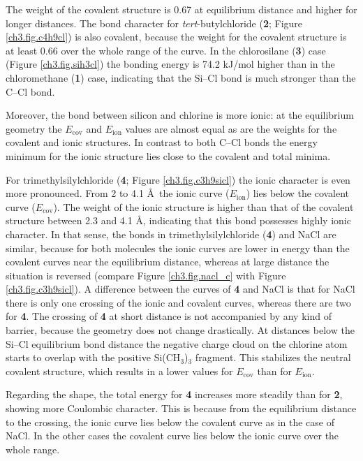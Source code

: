 The weight of the covalent structure is 0.67 at equilibrium distance and higher for longer distances. The bond character for \textit{tert}-butylchloride (\textbf{2}; Figure \ref{ch3.fig.c4h9cl}) is also covalent, because the weight for the covalent structure is at least 0.66 over the whole range of the curve.
In the chlorosilane (\textbf{3}) case (Figure \ref{ch3.fig.sih3cl}) the bonding energy is 74.2 kJ/mol higher than in the chloromethane (\textbf{1}) case, indicating that the Si--Cl bond is much stronger than the C--Cl bond. 

Moreover, the bond between silicon and chlorine is more ionic: at the equilibrium geometry the $E_\mathrm{cov}$ and $E_\mathrm{ion}$ values are almost equal as are the weights for the covalent and ionic structures. In contrast to both C--Cl bonds the energy minimum for the ionic structure lies close to the covalent and total minima.  

For trimethylsilylchloride (\textbf{4}; Figure \ref{ch3.fig.c3h9sicl}) the ionic character is even more pronounced. From 2 to 4.1 \AA\  the ionic curve ($E_\mathrm{ion}$) lies below the covalent curve ($E_\mathrm{cov}$). The weight of the ionic structure is higher than that of the covalent structure between 2.3 and 4.1 \AA, indicating that this bond possesses highly ionic character. In that sense, the bonds in trimethylsilylchloride (\textbf{4}) and NaCl are similar, because for both molecules the ionic curves are lower in energy than the covalent curves near the equilibrium distance, whereas at large distance the situation is reversed (compare Figure \ref{ch3.fig.nacl_c} with Figure \ref{ch3.fig.c3h9sicl}). A difference between the curves of \textbf{4} and NaCl is that for NaCl there is only one crossing of the ionic and covalent curves, whereas there are two for \textbf{4}. The crossing of \textbf{4} at short distance is not accompanied by any kind of barrier, because the geometry does not change drastically. At distances below the Si--Cl equilibrium bond distance the negative charge cloud on the chlorine atom starts to overlap with the positive Si(CH$_3$)$_3$ fragment. This stabilizes the neutral covalent structure, which results in a lower values for $E_\mathrm{cov}$ than for $E_\mathrm{ion}$. 

Regarding the shape, the total energy for \textbf{4} increases more steadily than for \textbf{2}, showing more Coulombic character. This is because from the equilibrium distance to the crossing, the ionic curve lies below the covalent curve as in the case of NaCl. In the other cases the covalent curve lies below the ionic curve over the whole range.

